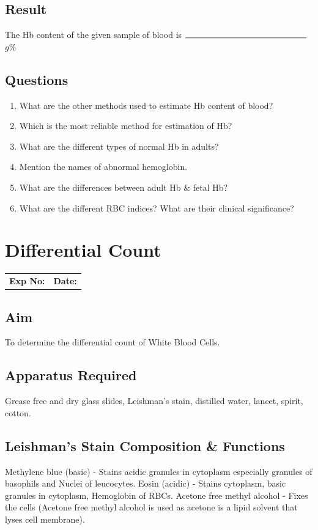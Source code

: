 \documentclass[a4paper,12pt,openany,oneside]{book}
\begin{document}
								\section*{Result}
								The Hb content of the given sample of blood is $\rule{5cm}{0.5pt}$ $g$\%
								\section*{Questions}
								\begin{enumerate}
									\item{What are the other methods used to estimate Hb content of blood?}
									\item{Which is the most reliable method for estimation of Hb?}
									\item{What are the different types of normal Hb in adults?}
									\item{Mention the names of abnormal hemoglobin.}
									\item{What are the differences between adult Hb \& fetal Hb?}
									\item{What are the different RBC indices? What are their clinical significance?}
								\end{enumerate}
					\chapter*{\centering Differential Count}
					\begin{tabular}{p{5in} p{1in}}
						\textbf{Exp No:}  & \textbf{Date:}\\
					\end{tabular}

					\section*{Aim}
					To determine the differential count of White Blood Cells.
					\section*{Apparatus Required}
					Grease free and dry glass slides, Leishman’s stain, distilled water, lancet, spirit, cotton.	
					\section*{Leishman's Stain Composition \& Functions}
					Methylene blue (basic) 	     -	Stains acidic granules in cytoplasm especially 						granules of basophils and Nuclei of leucocytes.\newline
					Eosin (acidic) 		     -	Stains cytoplasm, basic granules in 							cytoplasm, Hemoglobin of RBCs.\newline
					Acetone free methyl alcohol - 	Fixes the cells (Acetone free methyl alcohol 						is used as acetone is a lipid solvent that 		lyses cell membrane).
\end{document}
